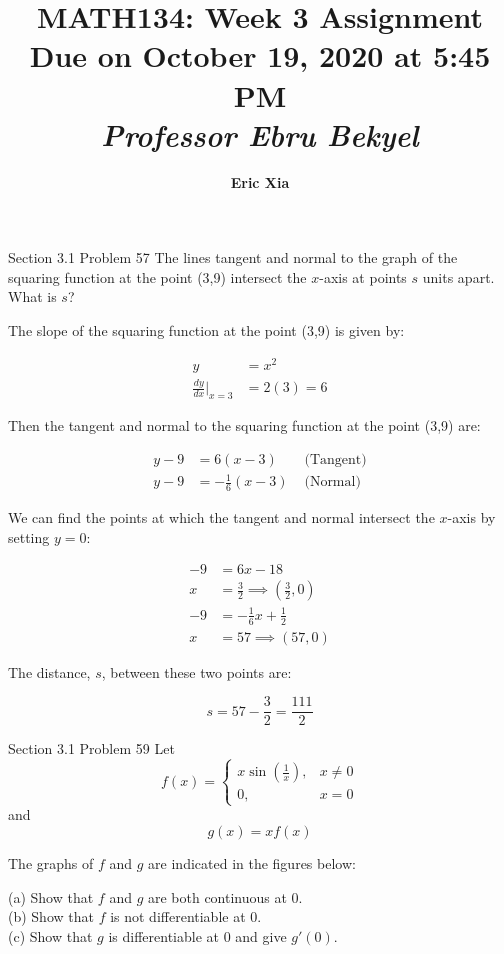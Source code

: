 \documentclass{article}
\title{
    \vspace{2in}
    \textmd{\textbf{MATH134: Week 3 Assignment}}\\
    \normalsize\vspace{0.1in}\small{Due on October 19, 2020 at 5:45 PM}\\
    \vspace{0.1in}\large{\textit{Professor Ebru Bekyel}}
    \vspace{3in}
}
\author{\textbf{Eric Xia}}
\date{}
\begin{document}
    \maketitle
    \pagebreak


    \thispagestyle{page2}

    \begin{tbhtheorem}{Section 3.1 Problem 57}
        The lines tangent and normal to the graph of the squaring function at the point (3,9) intersect the $x$-axis at points $s$ units apart. What is $s$?
    \end{tbhtheorem}

    The slope of the squaring function at the point (3,9) is given by:

    \begin{align*}
        y  &= x^2 \\
        \frac{dy}{dx}\Big|_{x=3} &= 2(3) = 6
    \end{align*}

    Then the tangent and normal to the squaring function at the point (3,9) are:

    \begin{align*}
        y-9 &= 6(x-3)           & \text{ (Tangent)} \\
        y-9 &= -\frac{1}{6}(x-3)    & \text{ (Normal)}
    \end{align*}

    We can find the points at which the tangent and normal intersect the $x$-axis by setting $y=0$:

    \begin{align*}
        - 9 &= 6x - 18 \\
        x   &= \frac{3}{2} \implies \left(\frac{3}{2},0\right) \\
        -9  &= -\frac{1}{6}x + \frac{1}{2} \\
        x   &= 57 \implies (57,0)
    \end{align*}

    The distance, $s$, between these two points are:

    \[
        s = 57 - \frac{3}{2} = \frac{111}{2}
    \]



    \begin{tbhtheorem}{Section 3.1 Problem 59}
        Let
        \[
            f(x) =
            \begin{cases}
                x\sin{(\frac{1}{x})},   & x \not = 0 \\
                0,                      & x = 0
            \end{cases}
        \]
        and
        \[
            g(x) = xf(x)
        \]

        The graphs of $f$ and $g$ are indicated in the figures below:

        (a) Show that $f$ and $g$ are both continuous at 0. \\
        (b) Show that $f$ is not differentiable at 0. \\
        (c) Show that $g$ is differentiable at 0 and give $g'(0)$.
    \end{tbhtheorem}
\end{document}
